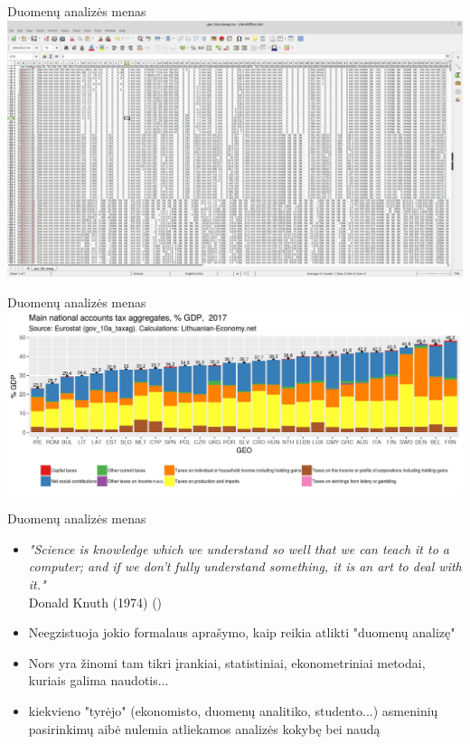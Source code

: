 \documentclass[11pt,xcolor=table]{beamer}
\begin{document}

\begin{frame}{Duomenų analizės menas}
\includegraphics[scale=0.17]{raw_data.png}
\end{frame}


\begin{frame}{Duomenų analizės menas}
\includegraphics[scale=0.45]{Tax_GDP_2017_EU.jpeg}
\end{frame}


\begin{frame}{Duomenų analizės menas}
\begin{itemize}
\item \textit{"Science is knowledge which we understand so well that we can teach it to a computer; and if we don't fully understand something, it is an art to deal with it."}
\\Donald Knuth (1974) (\href{http://www.paulgraham.com/knuth.html}{\color{blue}{Knuth: Computer Programming as an Art}})
\item Neegzistuoja jokio formalaus aprašymo, kaip reikia atlikti "duomenų analizę"
\item Nors yra žinomi tam tikri įrankiai, statistiniai, ekonometriniai metodai, kuriais galima naudotis...
\item kiekvieno "tyrėjo" (ekonomisto, duomenų analitiko, studento...) asmeninių pasirinkimų aibė nulemia atliekamos analizės kokybę bei naudą
\end{itemize}
\end{frame}
\end{document}
